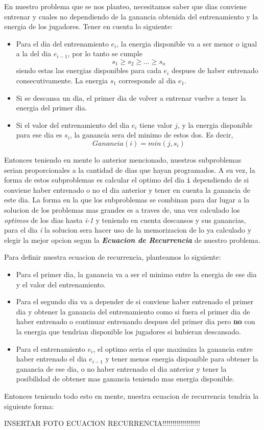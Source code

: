 En nuestro problema que se nos planteo, necesitamos saber que dias conviene entrenar y cuales no dependiendo de la ganancia obtenida del entrenamiento y la energia de los jugadores. Tener en cuenta lo siguiente:
\begin{itemize}
    \item Para el dia del entrenamiento $e_i$, la energia disponible va a ser menor o igual a la del dia $e_{i-1}$, por lo tanto se cumple
    \[ s_1 \geq s_2 \geq ... \geq s_n \]
    siendo estas las energias disponibles para cada $e_i$ despues de haber entrenado consecutivamente. La energia $s_1$ corresponde al dia $e_1$.
    \item Si se descansa un dia, el primer dia de volver a entrenar vuelve a tener la energia del primer dia.
    \item Si el valor del entrenamiento del dia $e_i$ tiene valor $j$, y la energia disponible para ese dia es $s_i$, la ganancia sera del minimo de estos dos. Es decir,
    \[ Ganancia(i) = min(j, s_i) \]
\end{itemize}
Entonces teniendo en mente lo anterior mencionado, nuestros subproblemas serian proporcionales a la cantidad de dias que hayan programados. A su vez, la forma de estos subproblemas es calcular el optimo del dia \texttt{i} dependiendo de si conviene haber entrenado o no el dia anterior y tener en cuenta la ganancia de este dia. La forma en la que los subproblemas se combinan para dar lugar a la solucion de los problemas mas grandes es a traves de, una vez calculado los \textit{optimos} de los dias hasta \textit{i-1} y teniendo en cuenta descansos y sus ganancias, para el dia \textit{i} la solucion sera hacer uso de la memorizacion de lo ya calculado y elegir la mejor opcion segun la \textbf{\textit{Ecuacion de Recurrencia}} de nuestro problema.

Para definir nuestra ecuacion de recurrencia, planteamos lo siguiente:
\begin{itemize}
    \item Para el primer dia, la ganancia va a ser el minimo entre la energia de ese dia y el valor del entrenamiento.
    \item Para el segundo dia va a depender de si conviene haber entrenado el primer dia y obtener la ganancia del entrenamiento como si fuera el primer dia de haber entrenado o continuar entrenando despues del primer dia pero \textbf{no} con la energia que tendrian disponible los jugadores si hubieran descansado.
    \item Para el entrenamiento $e_i$, el optimo seria el que maximiza la ganancia entre haber entrenado el dia $e_{i-1}$ y tener menos energia disponible para obtener la ganancia de ese dia, o no haber entrenado el dia anterior y tener la posibilidad de obtener mas ganancia teniendo mas energia disponible.
\end{itemize}
Entonces teniendo todo esto en mente, nuestra ecuacion de recurrencia tendria la siguiente forma:

INSERTAR FOTO ECUACION RECURRENCIA!!!!!!!!!!!!!!!!!!!

